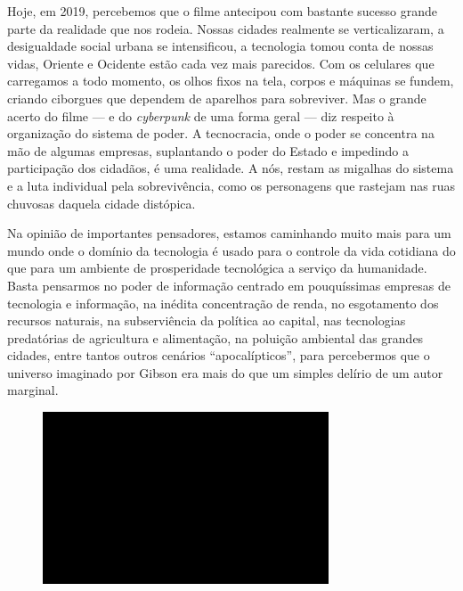 Hoje, em 2019, percebemos que o filme antecipou com bastante sucesso
grande parte da realidade que nos rodeia. Nossas cidades realmente se
verticalizaram, a desigualdade social urbana se intensificou, a
tecnologia tomou conta de nossas vidas, Oriente e Ocidente estão cada
vez mais parecidos. Com os celulares que carregamos a todo momento, os
olhos fixos na tela, corpos e máquinas se fundem, criando ciborgues que
dependem de aparelhos para sobreviver. Mas o grande acerto do filme --- e
do \emph{cyberpunk} de uma forma geral --- diz respeito à organização do
sistema de poder. A tecnocracia, onde o poder se concentra na mão de
algumas empresas, suplantando o poder do Estado e impedindo a
participação dos cidadãos, é uma realidade. A nós, restam as migalhas do
sistema e a luta individual pela sobrevivência, como os personagens que
rastejam nas ruas chuvosas daquela cidade distópica.

Na opinião de importantes pensadores, estamos caminhando muito mais para
um mundo onde o domínio da tecnologia é usado para o controle da vida
cotidiana do que para um ambiente de prosperidade tecnológica a serviço
da humanidade. Basta pensarmos no poder de informação centrado em %
pouquíssimas empresas de tecnologia e informação, na inédita
concentração de renda, no esgotamento dos recursos naturais, na
subserviência da política ao capital, nas tecnologias predatórias de
agricultura e alimentação, na poluição ambiental das grandes cidades,
entre tantos outros cenários ``apocalípticos'', para percebermos que o
universo imaginado por Gibson era mais do que um simples delírio de um
autor marginal.

\begin{figure}[!ht]
\centering
 \includegraphics[width=85mm]{./imgs/im1.jpg}
\caption{\tiny{}}
\end{figure}


